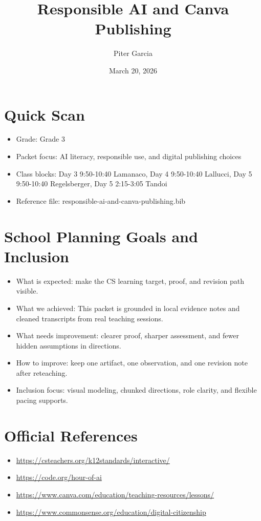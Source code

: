 \documentclass[11pt]{article}
\title{Responsible AI and Canva Publishing}
\author{Piter Garcia}
\date{March 20, 2026}
\begin{document}
\maketitle
\section*{Quick Scan}
\begin{itemize}[leftmargin=*]
\item Grade: Grade 3
\item Packet focus: AI literacy, responsible use, and digital publishing choices
\item Class blocks: Day 3 9:50-10:40 Lamanaco, Day 4 9:50-10:40 Lallucci, Day 5 9:50-10:40 Regelsberger, Day 5 2:15-3:05 Tandoi
\item Reference file: responsible-ai-and-canva-publishing.bib
\end{itemize}
\section*{School Planning Goals and Inclusion}
\begin{itemize}[leftmargin=*]
\item What is expected: make the CS learning target, proof, and revision path visible.
\item What we achieved: This packet is grounded in local evidence notes and cleaned transcripts from real teaching sessions.
\item What needs improvement: clearer proof, sharper assessment, and fewer hidden assumptions in directions.
\item How to improve: keep one artifact, one observation, and one revision note after reteaching.
\item Inclusion focus: visual modeling, chunked directions, role clarity, and flexible pacing supports.
\end{itemize}
\section*{Official References}
\begin{itemize}[leftmargin=*]
\item \url{https://csteachers.org/k12standards/interactive/}
\item \url{https://code.org/hour-of-ai}
\item \url{https://www.canva.com/education/teaching-resources/lessons/}
\item \url{https://www.commonsense.org/education/digital-citizenship}
\end{itemize}
\end{document}

